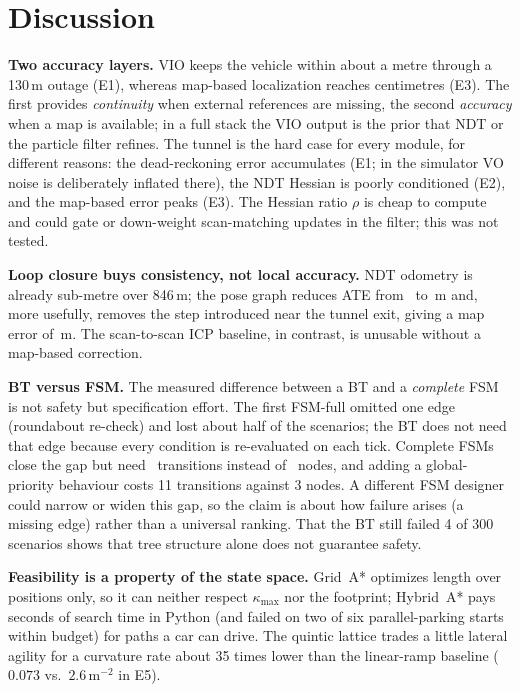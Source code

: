 \documentclass[11pt,a4paper]{article}
\begin{document}
\section{Discussion}
\textbf{Two accuracy layers.} VIO keeps the vehicle within about a metre through a 130\,m outage (E1), whereas map-based localization reaches centimetres (E3). The first provides \emph{continuity} when external references are missing, the second \emph{accuracy} when a map is available; in a full stack the VIO output is the prior that NDT or the particle filter refines. The tunnel is the hard case for every module, for different reasons: the dead-reckoning error accumulates (E1; in the simulator VO noise is deliberately inflated there), the NDT Hessian is poorly conditioned (E2), and the map-based error peaks (E3). The Hessian ratio $\rho$ is cheap to compute and could gate or down-weight scan-matching updates in the filter; this was not tested.

\textbf{Loop closure buys consistency, not local accuracy.} NDT odometry is already sub-metre over 846\,m; the pose graph reduces ATE from \slamNdt\ to \slamLoop\,m and, more usefully, removes the step introduced near the tunnel exit, giving a map error of \slamMapLoop\,m. The scan-to-scan ICP baseline, in contrast, is unusable without a map-based correction.

\textbf{BT versus FSM.} The measured difference between a BT and a \emph{complete} FSM is not safety but specification effort. The first FSM-full omitted one edge (roundabout re-check) and lost about half of the scenarios; the BT does not need that edge because every condition is re-evaluated on each tick. Complete FSMs close the gap but need \fsmTrans\ transitions instead of \btNodes\ nodes, and adding a global-priority behaviour costs 11 transitions against 3 nodes. A different FSM designer could narrow or widen this gap, so the claim is about how failure arises (a missing edge) rather than a universal ranking. That the BT still failed 4 of 300 scenarios shows that tree structure alone does not guarantee safety.

\textbf{Feasibility is a property of the state space.} Grid~A* optimizes length over positions only, so it can neither respect $\kappa_{\max}$ nor the footprint; Hybrid~A* pays seconds of search time in Python (and failed on two of six parallel-parking starts within budget) for paths a car can drive. The quintic lattice trades a little lateral agility for a curvature rate about 35 times lower than the linear-ramp baseline ($0.073$ vs.\ $2.6$\,m$^{-2}$ in E5).
\end{document}
